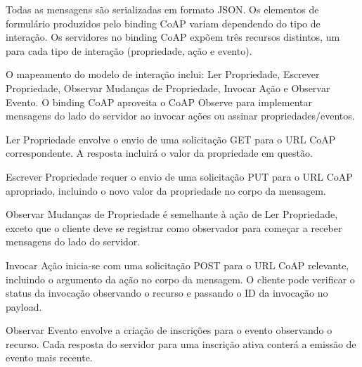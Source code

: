 Todas as mensagens são serializadas em formato JSON. Os elementos de formulário produzidos pelo binding CoAP variam dependendo do tipo de interação. Os servidores no binding CoAP expõem três recursos distintos, um para cada tipo de interação (propriedade, ação e evento).

O mapeamento do modelo de interação inclui: Ler Propriedade, Escrever Propriedade, Observar Mudanças de Propriedade, Invocar Ação e Observar Evento. O binding CoAP aproveita o CoAP Observe para implementar mensagens do lado do servidor ao invocar ações ou assinar propriedades/eventos.

Ler Propriedade envolve o envio de uma solicitação GET para o URL CoAP correspondente. A resposta incluirá o valor da propriedade em questão.

Escrever Propriedade requer o envio de uma solicitação PUT para o URL CoAP apropriado, incluindo o novo valor da propriedade no corpo da mensagem.

Observar Mudanças de Propriedade é semelhante à ação de Ler Propriedade, exceto que o cliente deve se registrar como observador para começar a receber mensagens do lado do servidor.

Invocar Ação inicia-se com uma solicitação POST para o URL CoAP relevante, incluindo o argumento da ação no corpo da mensagem. O cliente pode verificar o status da invocação observando o recurso e passando o ID da invocação no payload.

Observar Evento envolve a criação de inscrições para o evento observando o recurso. Cada resposta do servidor para uma inscrição ativa conterá a emissão de evento mais recente.
